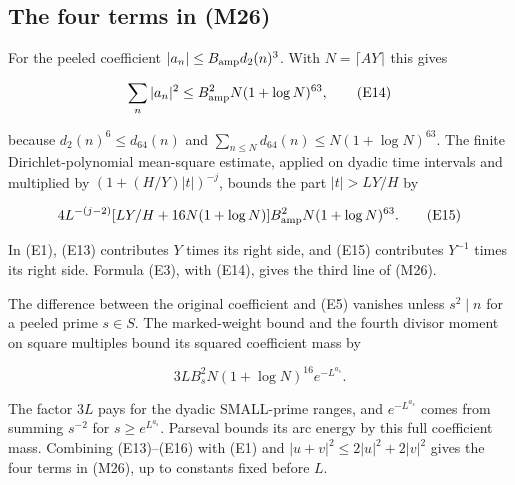 
\hypertarget{local-energy-the-four-terms-in-m26}{%
\subsection{The four terms in
(M26)}\label{local-energy-the-four-terms-in-m26}}

For the peeled coefficient \(|a_n|\le B_{\rm amp}d_2(n)^3\). With
\(N=\lceil AY\rceil\) this gives

\[
\sum_n|a_n|^2\le B_{\rm amp}^2N(1+\log N)^{63}, \tag{E14}
\]

because \(d_2(n)^6\le d_{64}(n)\) and
\(\sum_{n\le N}d_{64}(n)\le N(1+\log N)^{63}\). The finite
Dirichlet-polynomial mean-square estimate, applied on dyadic time
intervals and multiplied by \((1+(H/Y)|t|)^{-j}\), bounds the part
\(|t|>LY/H\) by

\[
4L^{-(j-2)}[LY/H+16N(1+\log N)]
 B_{\rm amp}^2N(1+\log N)^{63}. \tag{E15}
\]

In (E1), (E13) contributes \(Y\) times its right side, and (E15)
contributes \(Y^{-1}\) times its right side. Formula (E3), with (E14),
gives the third line of (M26).

The difference between the original coefficient and (E5) vanishes unless
\(s^2\mid n\) for a peeled prime \(s\in S\). The marked-weight bound and
the fourth divisor moment on square multiples bound its squared
coefficient mass by

\[
3L B_s^2N(1+\log N)^{16}e^{-L^{a_s}}. \tag{E16}
\]

The factor \(3L\) pays for the dyadic SMALL-prime ranges, and
\(e^{-L^{a_s}}\) comes from summing \(s^{-2}\) for \(s\ge e^{L^{a_s}}\).
Parseval bounds its arc energy by this full coefficient mass. Combining
(E13)--(E16) with (E1) and \(|u+v|^2\le2|u|^2+2|v|^2\) gives the four
terms in (M26), up to constants fixed before \(L\).

